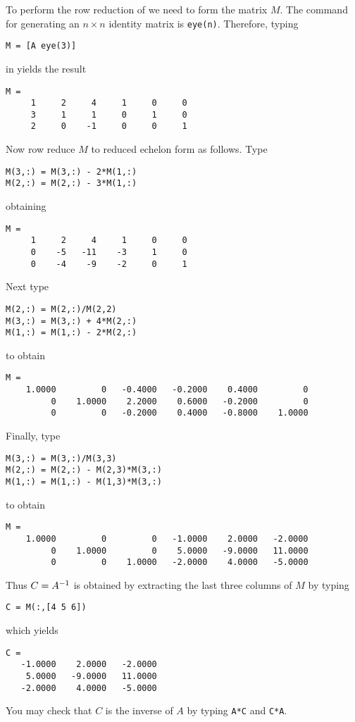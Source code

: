 To perform the row reduction of  we need to form the matrix
$M$. The \Matlab command for generating an $n\times n$ identity
matrix is {\tt eye(n)}.  Therefore, typing
\begin{verbatim}
M = [A eye(3)]
\end{verbatim} 
in \Matlab yields the result
\begin{verbatim}
M =
     1     2     4     1     0     0
     3     1     1     0     1     0
     2     0    -1     0     0     1
\end{verbatim}
Now row reduce $M$ to reduced echelon form as follows.  Type
\begin{verbatim}
M(3,:) = M(3,:) - 2*M(1,:)
M(2,:) = M(2,:) - 3*M(1,:)
\end{verbatim}
obtaining
\begin{verbatim}
M =
     1     2     4     1     0     0
     0    -5   -11    -3     1     0
     0    -4    -9    -2     0     1
\end{verbatim}
Next type
\begin{verbatim}
M(2,:) = M(2,:)/M(2,2)
M(3,:) = M(3,:) + 4*M(2,:)
M(1,:) = M(1,:) - 2*M(2,:)
\end{verbatim}
to obtain
\begin{verbatim}
M =
    1.0000         0   -0.4000   -0.2000    0.4000         0
         0    1.0000    2.2000    0.6000   -0.2000         0
         0         0   -0.2000    0.4000   -0.8000    1.0000
\end{verbatim}
Finally, type
\begin{verbatim}
M(3,:) = M(3,:)/M(3,3)
M(2,:) = M(2,:) - M(2,3)*M(3,:)
M(1,:) = M(1,:) - M(1,3)*M(3,:)
\end{verbatim}
to obtain
\begin{verbatim}
M =
    1.0000         0         0   -1.0000    2.0000   -2.0000
         0    1.0000         0    5.0000   -9.0000   11.0000
         0         0    1.0000   -2.0000    4.0000   -5.0000
\end{verbatim}
Thus $C=A^{-1}$ is obtained by extracting the last three columns
of $M$ by typing
\begin{verbatim}
C = M(:,[4 5 6])
\end{verbatim}
which yields
\begin{verbatim}
C =
   -1.0000    2.0000   -2.0000
    5.0000   -9.0000   11.0000
   -2.0000    4.0000   -5.0000
\end{verbatim}
You may check that $C$ is the inverse of $A$ by typing {\tt A*C}
and {\tt C*A}.

